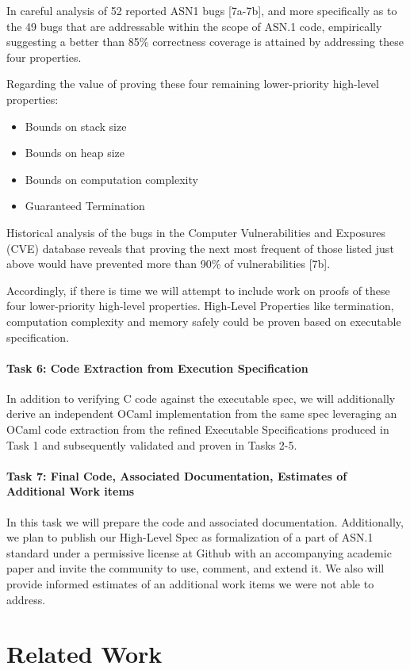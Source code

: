 \documentclass[acmsmall,nonacm]{acmart}
\begin{document}
In careful analysis of 52 reported ASN1 bugs [7a-7b], and more specifically as to the 49 bugs that are addressable within the scope of ASN.1 code, empirically suggesting a better than 85\% correctness coverage is attained by addressing  these four properties.

Regarding the value of proving these four remaining lower-priority high-level properties:
\begin{itemize}
\item Bounds on stack size
\item Bounds on heap size
\item Bounds on computation complexity
\item Guaranteed Termination
\end{itemize}
Historical analysis of the bugs in the Computer Vulnerabilities and Exposures (CVE) database reveals that proving the next most frequent of those listed just above would have prevented more than 90\% of vulnerabilities [7b]. 

Accordingly, if there is time we will attempt to include work on proofs of these four lower-priority high-level properties. High-Level Properties like termination, computation complexity and memory safely could be proven based on executable specification. 

\paragraph{Task 6: Code Extraction from Execution Specification}
In addition to verifying C code against the executable spec, we will additionally derive an independent OCaml implementation from the same spec leveraging an OCaml code extraction from the refined Executable Specifications produced in Task 1 and subsequently validated and proven in Tasks 2-5. 

\paragraph{Task 7: Final Code, Associated Documentation, Estimates of Additional Work items}
In this task we will prepare the code and associated documentation. Additionally, we plan to publish our High-Level Spec as formalization of a part of ASN.1 standard under a permissive license at Github with an accompanying academic paper and invite the community to use, comment, and extend it. 
We also will provide informed estimates of an additional work items we were not able to address. 

\section{Related Work}
\end{document}
